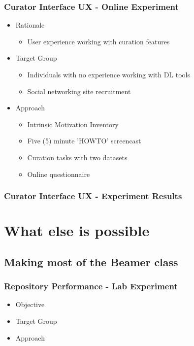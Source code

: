 \documentclass[xcolor=dvitex,t,11pt]{beamer}
\begin{document}
\begin{frame}[fragile]
\frametitle{Curator Interface UX - Online Experiment}
\begin{itemize}
\item Rationale
\begin{itemize}
\item User experience working with curation features
\end{itemize}
\item Target Group
\begin{itemize}
\item Individuals with no experience working with DL tools
\item Social networking site recruitment
\end{itemize}
\item Approach
\begin{itemize}
\item Intrinsic Motivation Inventory
\item Five (5) minute 'HOWTO' screencast
\item Curation tasks with two datasets
\item Online questionnaire
\end{itemize}
\end{itemize}
\end{frame}


\begin{frame}[fragile]
\frametitle{Curator Interface UX - Experiment Results}
\centering

\end{frame}


\section{What else is possible}


\subsection{Making most of the Beamer class}

\begin{frame}[fragile]
\frametitle{Repository Performance - Lab Experiment}
\begin{itemize}
\item Objective
\item Target Group
\item Approach
\end{itemize}
\end{frame}
\end{document}
